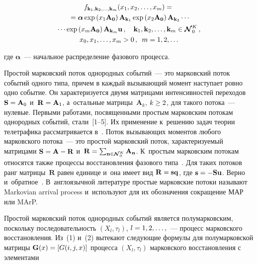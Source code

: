 \begin{multicols}{2}
\noindent
\begin{multline}
f_{\mathbf{k}_1, \mathbf{k}_2, \ldots , \mathbf{k}_m} (x_1, x_2, \ldots , 
x_m)={}\\
{}=\bm{\alpha}\exp \left( x_1\mathbf{A}_{\mathbf{0}}\right) 
\mathbf{A}_{\mathbf{k}_1}\exp \left( x_2\mathbf{A}_{\mathbf{0}}\right) 
\mathbf{A}_{\mathbf{k}_2}\cdots\\
\cdots \exp \left( x_m\mathbf{A}_{\mathbf{0}}\right) 
\mathbf{A}_{\mathbf{k}_m}\mathbf{u}\,,\quad
\mathbf{k}_1, \mathbf{k}_2, \ldots , \mathbf{k}_m\in 
\boldsymbol{\mathcal{N}}_0^K\,,\\
 x_0, x_1, \ldots , x_m>0\,,\enskip m=1,2,\ldots
\label{e4-nau}
\end{multline}

\vspace*{-6pt}

\noindent
где $\bm{\alpha}$~--- начальное распределение фазового про\-цесса.


  
  Простой марковский поток однородных событий~--- это марковский поток 
событий одного типа, причем в каждый вызывающий момент наступает ровно 
одно событие. Он характеризуется двумя мат\-ри\-ца\-ми интенсивностей 
переходов $\mathbf{S}\hm= \mathbf{A}_0$ и~$\mathbf{R}\hm= \mathbf{A}_1$, 
а~остальные матрицы~$\mathbf{A}_k$, $k\hm\geq 2$, для такого потока~--- 
нулевые. Первыми работами, посвященными простым марковским потокам 
однородных событий, стали~[1--5]. Их применение к~решению задач теории 
телетрафика рассматривается  
в~\cite{6-nau, 7-nau}. Поток вызывающих моментов любого марковского 
потока~--- это простой марковский поток, характеризуемый матрицами 
$\mathbf{S}\hm= \mathbf{A}\hm-\mathbf{R}$ и~$\mathbf{R}\hm= 
\sum\nolimits_{\mathbf{n}\in \boldsymbol{\mathcal{N}}_0^K} 
\mathbf{A}_{\mathbf{n}}$. К~простым марковским потокам относятся также 
процессы восстановления фазового типа~\cite{8-nau}. Для таких потоков ранг 
матрицы~$\mathbf{R}$ равен единице и~она имеет вид $\mathbf{R}\hm= 
\mathbf{sq}$, где $\mathbf{s}\hm= -\mathbf{Su}$. Верно и~обратное~\cite{7-nau}. 
В~англоязычной литературе простые марковские потоки называют 
Markovian arrival process и~используют для их обозначения сокращение МАР 
или MArP.
  
  Простой марковский поток однородных событий является 
полумарковским, поскольку последовательность $(X_l, \tau_l)$, $l\hm=1, 
2,\ldots,$~--- процесс марковского восстановления. Из~(1) и~(2) вытекают 
следующие формулы для полумарковской матрицы $\mathbf{G}(x)\hm= \left[ 
G(i,j,x)\right]$ процесса $(X_l,\tau_l)$ марковского восстановления с 
элементами 


\end{multicols}

